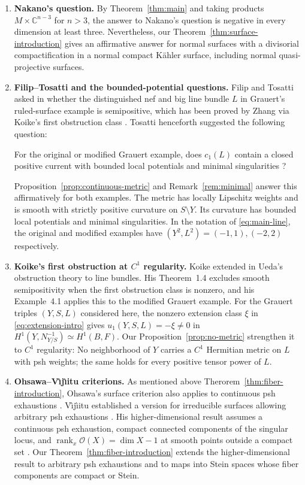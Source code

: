 \documentclass[11pt]{amsart}
\theoremstyle{definition}
\theoremstyle{remark}
\numberwithin{equation}{section}
\newcommand{\C}{\mathbb C}
\newcommand{\OO}{\mathcal O}
\begin{document}
\begin{enumerate}[label=\textbf{(\roman*)},widest=iii,leftmargin=*]
\item \textbf{Nakano's  question.}
By Theorem~\ref{thm:main} and taking products $M\times\C^{n-3}$ for $n>3$, the answer to Nakano's question is negative in every dimension at least three.
Nevertheless, our Theorem~\ref{thm:surface-introduction} gives an affirmative answer for
normal surfaces with a divisorial compactification in a normal compact
K\"ahler surface, including normal quasi-projective surfaces.

\item \textbf{Filip--Tosatti and the bounded-potential questions.}
Filip and Tosatti asked in \cite[Problem~2.2, p.~2989]{FilipTosatti2018} whether the distinguished nef and big
line bundle $L$ in Grauert's ruled-surface example is semipositive, which has been proved by
Zhang via Koike's first
obstruction class \cite[Theorem~1.2]{Zhang2025}.
Tosatti henceforth suggested the following question:

For the original or modified Grauert example, does $c_1(L)$ contain a closed positive current with bounded local potentials and minimal singularities
\cite[\S4]{Zhang2025}?

Proposition~\ref{prop:continuous-metric} and Remark~\ref{rem:minimal}
answer this affirmatively for both examples. The metric has locally
Lipschitz weights and is smooth with strictly positive curvature on
$S\setminus Y$. Its curvature has bounded local potentials and minimal
singularities. In the notation of \eqref{eq:main-line}, the original
and modified examples have $(Y^2,L^2)=(-1,1),(-2,2)$ respectively.

\item \textbf{Koike's first obstruction at \boldmath$C^1$ regularity.}
Koike extended in \cite{Koike2021} Ueda's obstruction theory to line bundles. His
Theorem~1.4 excludes smooth semipositivity when the first obstruction
class is nonzero, and his Example~4.1 applies this to the modified Grauert
example.
For the Grauert triples $(Y,S,L)$ considered here, the nonzero extension class
$\xi$ in \eqref{eq:extension-intro} gives $u_1(Y,S,L)=-\xi\ne0$ in $H^1(Y,N_{Y/S}^{-1})\simeq H^1(B,F)$.
Our Proposition~\ref{prop:no-metric} strengthen it to $C^1$ regularity: No neighborhood of $Y$
carries a $C^1$ Hermitian metric on $L$ with psh weights; the same
holds for every positive tensor power of $L$.

\item \textbf{Ohsawa--V\^{\i}j\^{\i}itu criterions.}
As mentioned above Therorem~\ref{thm:fiber-introduction}, Ohsawa's surface criterion also applies to continuous psh
exhaustions \cite[pp.~155--156]{Ohsawa1981}.
V\^{\i}j\^{\i}itu established a version for irreducible surfaces
allowing arbitrary psh exhaustions
\cite[Theorem~1.1]{Vajaitu2022}.
His higher-dimensional result assumes a continuous psh
exhaustion, compact connected components of the singular locus,
and $\operatorname{rank}_x\OO(X)=\dim X-1$ at smooth points
outside a compact set \cite[Theorem~1.1]{VijituForum2022}.
Our Theorem~\ref{thm:fiber-introduction} extends the higher-dimensional
result to arbitrary psh exhaustions and to maps into Stein
spaces whose fiber components are compact or Stein.


\end{enumerate}
\end{document}
